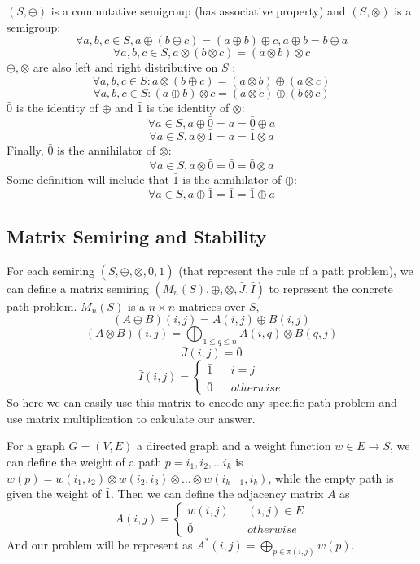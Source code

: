 \documentclass[a4paper,12pt,twoside,openright]{report}
\begin{document}
$(S,\oplus)$ is a commutative semigroup (has associative property) and $(S,\otimes)$ is a semigroup:
\[
\forall a,b,c \in S, a \oplus (b\oplus c) = (a \oplus b) \oplus c,a \oplus b = b \oplus a
\]
\[
\forall a,b,c \in S, a \otimes (b\otimes c) = (a \otimes b) \otimes c
\]
$\oplus,\otimes$ are also left and right distributive on $S$ : 
\[
\forall a,b,c \in S: a \otimes(b \oplus c) = (a \otimes b) \oplus (a \otimes c)
\]
\[
\forall a,b,c \in S:(a \oplus b) \otimes c  = (a \otimes c) \oplus (b \otimes c)
\] 
$\bar0$ is the identity of $\oplus$ and  $\bar1$ is the identity of $\otimes$: 
\[\forall a \in S, a \oplus \bar{0} = a = \bar{0} \oplus a\]
\[\forall a \in S, a \otimes \bar{1} = a = \bar{1} \otimes a\]
Finally, $\bar0$ is the  annihilator of $\otimes$: 
\[\forall a \in S, a \otimes \bar{0} = \bar{0} = \bar{0} \otimes a\]
Some definition will include that $\bar1$ is the annihilator of $\oplus$:
\[\forall a \in S, a \oplus \bar{1} = \bar{1} = \bar{1} \oplus a\]

\subsection{Matrix Semiring and Stability}
For each semiring $(S,\oplus,\otimes,\bar0,\bar1)$ (that represent the rule of a path problem), we can define a matrix semiring $(M_n(S),\oplus,\otimes,\bar{J},\bar{I})$ to represent the concrete path problem. $M_n(S)$ is a $n\times n$ matrices over $S$,
\[(A \oplus B)(i,j) = A(i,j)\oplus B(i,j)\]
\[(A \otimes B)(i,j) = \bigoplus_{1\leq q \leq n}A(i,q)\otimes B(q,j)\]
\[\bar{J}(i,j) = \bar0\]
\[\bar{I}(i,j)=\left\{
\begin{array}{rcl}
\bar1       &      & {i = j}\\
\bar0     &      & {otherwise}
\end{array} \right.\]
So here we can easily use this matrix to encode any specific path problem and use matrix multiplication to calculate our answer. 

For a graph $G = (V,E)$ a directed graph and a weight function $w \in E \rightarrow S$, 
we can define the weight of a path $p = i_1,i_2, \dots i_k$ is $w(p) = w (i_1,i_2) \otimes w(i_2,i_3)\otimes \dots \otimes w(i_{k-1},i_k)$, while the empty path is given the weight of $\bar1$.
Then we can define the adjacency matrix $A$ as 
\[A(i,j)=\left\{
\begin{array}{rcl}
w(i,j)      &      & {(i,j)\in E}\\
\bar0     &      & {otherwise}
\end{array} \right.\]
And our problem will be represent as $A^*(i,j) = \bigoplus_{p \in \pi (i,j)}w(p)$.
\end{document}
